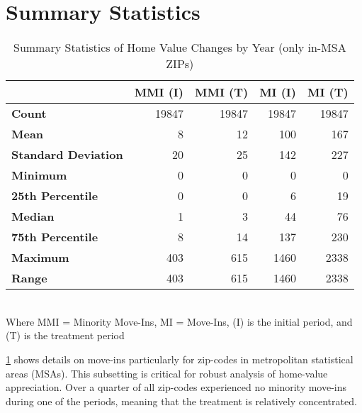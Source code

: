 \documentclass{article}
\begin{document}
\section{Summary Statistics}
\begin{table}[H]
    \centering
    \caption{Summary Statistics of Home Value Changes by Year (only in-MSA ZIPs)}\label{move-in-table}
    \begin{tabular}{l|rrrr}
    \toprule
    & \textbf{MMI (I)} & \textbf{MMI (T)} & \textbf{MI (I)} & \textbf{MI (T)} \\
    \midrule
    \textbf{Count} & 19847 & 19847 & 19847 & 19847 \\
    \textbf{Mean} & 8 & 12 & 100 & 167 \\
    \textbf{Standard Deviation} & 20 & 25 & 142 & 227 \\
    \textbf{Minimum} & 0 & 0 & 0 & 0 \\
    \textbf{25th Percentile} & 0 & 0 & 6 & 19 \\
    \textbf{Median} & 1 & 3 & 44 & 76 \\
    \textbf{75th Percentile} & 8 & 14 & 137 & 230 \\
    \textbf{Maximum} & 403 & 615 & 1460 & 2338 \\
    \textbf{Range} & 403 & 615 & 1460 & 2338 \\
    \bottomrule
    \end{tabular}\\
    Where MMI = Minority Move-Ins, MI = Move-Ins, (I) is the initial period, and (T) is the treatment period
\end{table}
\cref{move-in-table} shows details on move-ins particularly for zip-codes in metropolitan statistical areas (MSAs). This subsetting is critical for robust analysis of home-value appreciation. Over a quarter of all zip-codes experienced no minority move-ins during one of the periods, meaning that the treatment is relatively concentrated.
\end{document}
